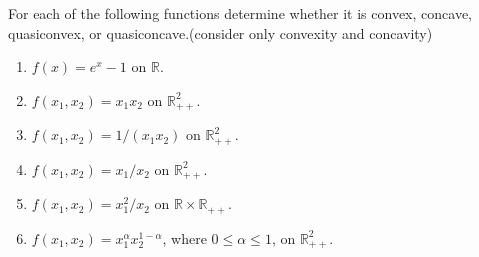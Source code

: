 \begin{problem}[3.16]
    For each of the following functions determine whether it is convex, concave, quasiconvex, or quasiconcave.(consider only convexity and concavity)
    \begin{enumerate}
        \item $f(x) = e^x - 1$ on $\mathbb{R}$.
        \item $f(x_1, x_2) = x_1x_2$ on $\mathbb{R}^2_{++}$.
        \item $f(x_1, x_2) = 1 / (x_1x_2)$ on $\mathbb{R}^2_{++}$.
        \item $f(x_1, x_2) = x_1/x_2$ on $\mathbb{R}^2_{++}$.
        \item $f(x_1, x_2) = x_1^2/x_2$ on $\mathbb{R}\times \mathbb{R}_{++}$.
        \item $f(x_1, x_2) = x_1^\alpha x_2^{1 - \alpha}$, where $0\le \alpha \le 1$, on $\mathbb{R}^2_{++}$.
    \end{enumerate}


\end{problem}
